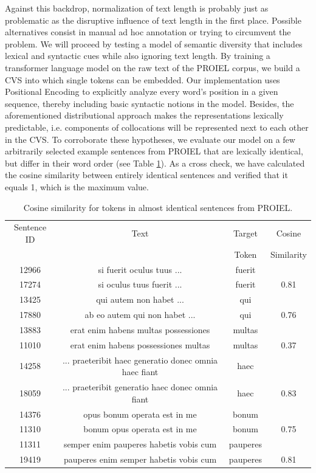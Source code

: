 \documentclass[runningheads]{llncs}
\begin{document}
Against this backdrop, normalization of text length is probably just as problematic as the disruptive influence of text length in the first place. Possible alternatives consist in manual ad hoc annotation or trying to circumvent the problem. We will proceed by testing a model of semantic diversity that includes lexical and syntactic cues while also ignoring text length. By training a transformer language model \parencite[9]{vaswaniAttentionAllYou2017} on the raw text of the PROIEL corpus, we build a \gls{CVS} into which single tokens can be embedded. Our implementation uses Positional Encoding \parencite[4]{lampleCrosslingualLanguageModel2019} to explicitly analyze every word's position in a given sequence, thereby including basic syntactic notions in the model. Besides, the aforementioned distributional approach makes the representations lexically predictable, i.e. components of collocations will be represented next to each other in the \gls{CVS}. To corroborate these hypotheses, we evaluate our model on a few arbitrarily selected example sentences from PROIEL that are lexically identical, but differ in their word order (see Table \ref{tableCosSimWordOrder}). As a cross check, we have calculated the cosine similarity between entirely identical sentences and verified that it equals 1, which is the maximum value.
\begin{table}[ht]
	\begin{tabular}{ c | c | c | c }
  		Sentence ID & Text & Target & Cosine \\ 
		 & & Token & Similarity \\ \hline
  		12966 & si fuerit oculus tuus ... & fuerit & \\
		17274 & si oculus tuus fuerit ... & fuerit & 0.81 \\ \hline
		13425 & qui autem non habet ... & qui & \\
		17880 & ab eo autem qui non habet ... & qui & 0.76 \\ \hline
		13883 & erat enim habens multas possessiones & multas & \\
		11010 & erat enim habens possessiones multas & multas & 0.37 \\ \hline
		14258 & ... praeteribit haec generatio donec omnia haec fiant & haec & \\
		18059 & ... praeteribit generatio haec donec omnia fiant & haec & 0.83 \\ \hline
		14376 & opus bonum operata est in me & bonum & \\
		11310 & bonum opus operata est in me & bonum & 0.75 \\ \hline
		11311 & semper enim pauperes habetis vobis cum & pauperes & \\
		19419 & pauperes enim semper habetis vobis cum & pauperes & 0.81 \\ \hline
	\end{tabular}
	\caption{Cosine similarity for tokens in almost identical sentences from PROIEL.}
	\label{tableCosSimWordOrder}
\end{table}
\end{document}
